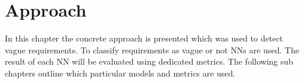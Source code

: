 \chapter{Approach}
\label{chp:approach}


In this chapter the concrete approach is presented which was used to detect vague requirements.
To classify requirements as vague or not \acp{NN} are used.
The result of each \ac{NN} will be evaluated using dedicated metrics.
The following sub chapters outline which particular models and metrics are used.



